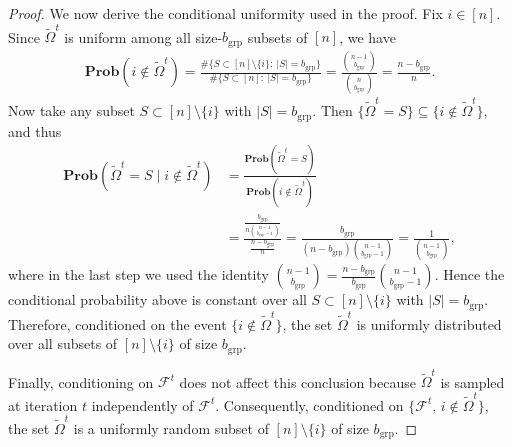 \documentclass{article}
\newcommand{\Prob}{\mathbf{Prob}}
\theoremstyle{plain}
\begin{document}
\begin{proof}
We now derive the conditional uniformity used in the proof. Fix $i\in[n]$. Since $\tilde{\Omega}^t$ is uniform among all size-$b_{\mathrm{grp}}$ subsets of $[n]$, we have
\begin{align*}
\Prob(i\notin\tilde{\Omega}^t)
=\frac{\#\{S\subset[n]\setminus\{i\}:\ |S|=b_{\mathrm{grp}}\}}{\#\{S\subset[n]:\ |S|=b_{\mathrm{grp}}\}}
=\frac{\binom{n-1}{b_{\mathrm{grp}}}}{\binom{n}{b_{\mathrm{grp}}}}
=\frac{n-b_{\mathrm{grp}}}{n}.
\end{align*}
Now take any subset $S\subset[n]\setminus\{i\}$ with $|S|=b_{\mathrm{grp}}$. Then $\{ \tilde{\Omega}^t=S\}\subseteq \{i\notin\tilde{\Omega}^t\}$, and thus
\begin{align*}
\Prob(\tilde{\Omega}^t=S \mid i\notin\tilde{\Omega}^t)
&=\frac{\Prob(\tilde{\Omega}^t=S)}{\Prob(i\notin\tilde{\Omega}^t)}\\
&=\frac{\frac{b_{\mathrm{grp}}}{n\binom{n-1}{b_{\mathrm{grp}}-1}}}{\frac{n-b_{\mathrm{grp}}}{n}}
=\frac{b_{\mathrm{grp}}}{(n-b_{\mathrm{grp}})\binom{n-1}{b_{\mathrm{grp}}-1}}
=\frac{1}{\binom{n-1}{b_{\mathrm{grp}}}},
\end{align*}
where in the last step we used the identity $\binom{n-1}{b_{\mathrm{grp}}}=\frac{n-b_{\mathrm{grp}}}{b_{\mathrm{grp}}}\binom{n-1}{b_{\mathrm{grp}}-1}$.
Hence the conditional probability above is constant over all $S\subset[n]\setminus\{i\}$ with $|S|=b_{\mathrm{grp}}$. Therefore, conditioned on the event $\{i\notin\tilde{\Omega}^t\}$, the set $\tilde{\Omega}^t$ is uniformly distributed over all subsets of $[n]\setminus\{i\}$ of size $b_{\mathrm{grp}}$.

Finally, conditioning on $\mathcal{F}^t$ does not affect this conclusion because $\tilde{\Omega}^t$ is sampled at iteration $t$ independently of $\mathcal{F}^t$. Consequently, conditioned on $\{\mathcal{F}^t,\, i\notin\tilde{\Omega}^t\}$, the set $\tilde{\Omega}^t$ is a uniformly random subset of $[n]\setminus\{i\}$ of size $b_{\mathrm{grp}}$.


\end{proof}
\end{document}
